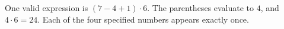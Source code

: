 One valid expression is $\boxed{(7-4+1)\cdot6}$. The parentheses evaluate to $4$, and $4\cdot6=24$. Each of the four specified numbers appears exactly once.
